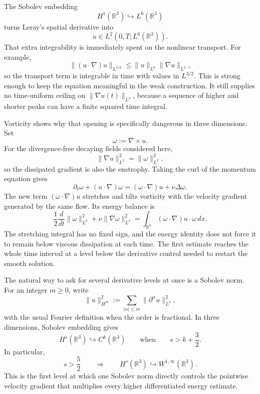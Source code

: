 The Sobolev embedding
\[
  H^1(\mathbb R^3)\hookrightarrow L^6(\mathbb R^3)
\]
turns Leray's spatial derivative into
\[
  u\in L^2(0,T;L^6(\mathbb R^3)).
\]
That extra integrability is immediately spent on the nonlinear transport.
For example,
\[
  \lVert(u\cdot\nabla)u\rVert_{L^{3/2}}
  \leq
  \lVert u\rVert_{L^6}
  \lVert\nabla u\rVert_{L^2},
\]
so the transport term is integrable in time with values in \(L^{3/2}\).
This is strong enough to keep the equation meaningful in the weak construction.
It still supplies no time-uniform ceiling on \(\lVert\nabla u(t)\rVert_{L^2}\), because a sequence of higher and shorter peaks can have a finite squared time integral.

Vorticity shows why that opening is specifically dangerous in three dimensions.
Set
\[
  \omega:=\nabla\times u.
\]
For the divergence-free decaying fields considered here,
\[
  \lVert\nabla u\rVert_{L^2}^2
  =
  \lVert\omega\rVert_{L^2}^2,
\]
so the dissipated gradient is also the enstrophy.
Taking the curl of the momentum equation gives
\[
  \partial_t\omega+(u\cdot\nabla)\omega
  =
  (\omega\cdot\nabla)u+\nu\Delta\omega.
\]
The new term \((\omega\cdot\nabla)u\) stretches and tilts vorticity with the velocity gradient generated by the same flow.
Its energy balance is
\[
  \frac12\frac{d}{dt}\lVert\omega\rVert_{L^2}^2
  +
  \nu\lVert\nabla\omega\rVert_{L^2}^2
  =
  \int_{\mathbb R^3}(\omega\cdot\nabla)u\cdot\omega\,dx.
\]
The stretching integral has no fixed sign, and the energy identity does not force it to remain below viscous dissipation at each time.
The first estimate reaches the whole time interval at a level below the derivative control needed to restart the smooth solution.


The natural way to ask for several derivative levels at once is a Sobolev norm.
For an integer \(m\geq0\), write
\[
  \lVert u\rVert_{H^m}^2
  :=
  \sum_{|\alpha|\leq m}
  \lVert\partial^\alpha u\rVert_{L^2}^2,
\]
with the usual Fourier definition when the order is fractional.
In three dimensions, Sobolev embedding gives \parencite[Theorem~7.28]{Cerda2010}
\[
  H^s(\mathbb R^3)\hookrightarrow C^k(\mathbb R^3)
  \qquad
  \text{when}
  \qquad
  s>k+\frac32.
\]
In particular,
\[
  s>\frac52
  \qquad\Longrightarrow\qquad
  H^s(\mathbb R^3)\hookrightarrow W^{1,\infty}(\mathbb R^3).
\]
This is the first level at which one Sobolev norm directly controls the pointwise velocity gradient that multiplies every higher differentiated energy estimate.


